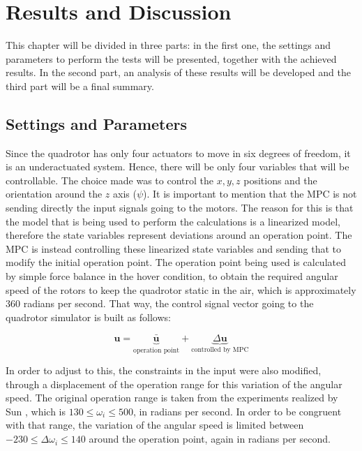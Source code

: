 \chapter{Results and Discussion}
\label{chap:Results_and_Discussion}

This chapter will be divided in three parts: in the first one, the settings and parameters to perform the tests will be presented, together with the achieved results. In the second part, an analysis of these results will be developed and the third part will be a final summary.

\section{Settings and Parameters}

Since the quadrotor has only four actuators to move in six degrees of freedom, it is an underactuated system. Hence, there will be only four variables that will be controllable. The choice made was to control the $x, y, z$ positions and the orientation around the $z$ axis ($\psi$). It is important to mention that the MPC is not sending directly the input signals going to the motors. The reason for this is that the model that is being used to perform the calculations is a linearized model, therefore the state variables represent deviations around an operation point. The MPC is instead controlling these linearized state variables and sending that to modify the initial operation point. The operation point being used is calculated by simple force balance in the hover condition, to obtain the required angular speed of the rotors to keep the quadrotor static in the air, which is approximately $360$ radians per second. That way, the control signal vector going to the quadrotor simulator is built as follows:

\begin{equation*}
\mathbf{u} = \underbrace{\mathbf{\bar{u}}}_\textrm{operation point} + \underbrace{\Delta \mathbf{u}}_\textrm{controlled by MPC}
\end{equation*}

In order to adjust to this, the constraints in the input were also modified, through a displacement of the operation range for this variation of the angular speed. The original operation range is taken from the experiments realized by Sun \cite{ref:YueSun2012}, which is $130 \leq \omega_{i} \leq 500$, in radians per second. In order to be congruent with that range, the variation of the angular speed is limited between $-230 \leq \Delta \omega_{i} \leq 140$ around the operation point, again in radians per second.\\ 

